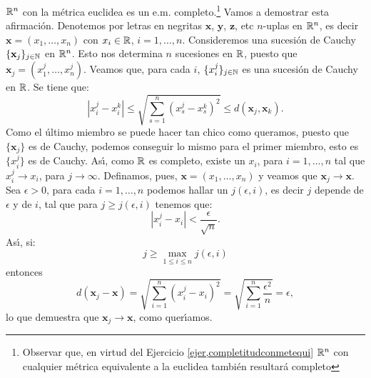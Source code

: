  \begin{ejemplo}{} $\mathbb{R}^n$ con la métrica euclidea es un e.m.
 completo.\footnote{Observar que, en virtud del Ejercicio
 \vref{ejer,completitudconmetequi} $\mathbb{R}^n$ con cualquier
 métrica equivalente a la euclidea también resultará
 completo} Vamos a demostrar esta afirmación. Denotemos
 por letras en negritas $\mathbf{x}$, $\mathbf{y}$, $\mathbf{z}$,
 etc $n$-uplas en $\mathbb{R}^n$, es decir $\mathbf{x}=(x_1,\dots, x_n)$
 con $x_i\in\mathbb{R}$, $i=1,\dots,n$. Consideremos una sucesión de
 Cauchy  $\{\mathbf{x}_j\}_{j\in\mathbb{N}}$ en $\mathbb{R}^n$. Esto nos determina $n$
 sucesiones en $\mathbb{R}$, puesto que
 $\mathbf{x}_j=(x_1^j,\dots,x_n^j)$. Veamos que, para cada $i$,
 $\{x_i^j\}_{j\in\mathbb{N}}$ es una sucesión de Cauchy en $\mathbb{R}$. Se
 tiene que:
\[
    |x_i^j-x_i^k|\leq \sqrt{\sum\limits_{s=1}^n(x_s^j-x_s^k)^2}\leq
    d(\mathbf{x}_j,\mathbf{x}_k).
\]
Como el último miembro se puede hacer tan chico como queramos,
puesto que $\{\mathbf{x}_j\}$ es de Cauchy, podemos conseguir lo
mismo para el primer miembro, esto es $\{x_i^j\}$ es de Cauchy.
As\'{\i}, como $\mathbb{R}$ es completo, existe un $x_i$, para
$i=1,\dots,n$ tal que $x_i^j\rightarrow x_i$, para
$j\rightarrow\infty$. Definamos, pues,
$\mathbf{x}=(x_1,\dots,x_n)$ y veamos que $\mathbf{x}_j\rightarrow
\mathbf{x}$. Sea $\epsilon>0$, para cada $i=1,\dots,n$ podemos
hallar un $j(\epsilon,i)$, es decir $j$ depende de $\epsilon $ y
de $i$, tal que para $j\geq j(\epsilon, i)$ tenemos que:
\[
    |x_i^j-x_i|<\frac{\epsilon}{\sqrt{n}}.
\]
As\'{\i}, si:
\[
    j\geq\max\limits_{1\leq i\leq n}j(\epsilon,i)
\]
entonces
\[
    d(\mathbf{x}_j-\mathbf{x})=\sqrt{\sum\limits_{i=1}^n(x_i^j-x_i)^2}=
    \sqrt{\sum\limits_{i=1}^n\frac{\epsilon^2}{n}}=\epsilon,
\]
lo que demuestra que $\mathbf{x}_j\rightarrow \mathbf{x}$, como
quer\'{\i}amos.
\end{ejemplo}

